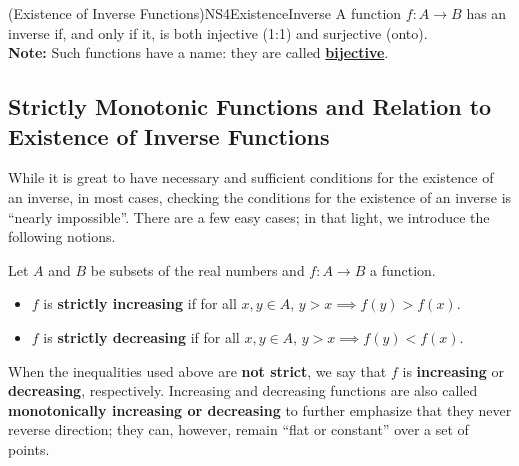 \begin{figure}[hbt]
    \label{fig:MonotonicVsNOTPlatform}
\end{figure}

\bigskip

\begin{propColor}{(Existence of Inverse Functions)}{NS4ExistenceInverse}
 A function $f:A \to B$ has an inverse if, and only if it, is both injective (1:1) and surjective (onto). \\
 
 \textbf{Note:} Such functions have a name: they are called \href{https://en.wikipedia.org/wiki/Bijection}{\bf bijective}.
\end{propColor}



\subsection{Strictly Monotonic Functions and Relation to Existence of Inverse Functions}
\label{sec:MonotonicFunctionsAndInverseFunctions}

While it is great to have necessary and sufficient conditions for the existence of an inverse, in most cases, checking the conditions for the existence of an inverse is ``nearly impossible''. There are a few easy cases; in that light, we introduce the following notions.

\begin{tcolorbox}[colback=mylightblue, title = {\bf Strictly Monotonic Functions}, breakable]

\begin{definition} Let $A$ and $B$ be subsets of the real numbers and $f:A \to B$ a function. 
\begin{itemize}
    \item $f$ is \textbf{strictly increasing} if for all $x, y \in A$, $y > x \implies f(y) > f(x)$. 
    \item  $f$ is \textbf{strictly decreasing} if for all $x, y \in A$, $y > x \implies f(y) < f(x)$. 
\end{itemize}
When the inequalities used above are \textbf{not strict}, we say that $f$ is \textbf{increasing} or \textbf{decreasing}, respectively. Increasing and decreasing functions are also called \textbf{monotonically increasing or decreasing} to further emphasize that they never reverse direction; they can, however, remain ``flat or constant'' over a set of points. 
\end{definition}

\end{tcolorbox}
\bigskip

